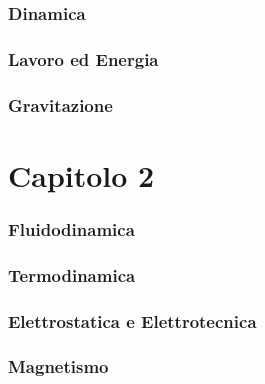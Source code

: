 \documentclass[11pt]{article}
\begin{document}
\section{Dinamica}
\section{Lavoro ed Energia}
\section{Gravitazione}
\part{Capitolo 2}
\section{Fluidodinamica}

\section{Termodinamica}

\section{Elettrostatica e Elettrotecnica}

\section{Magnetismo}
\end{document}
